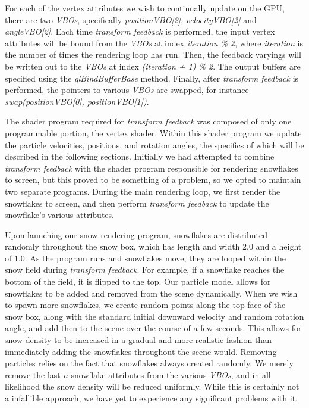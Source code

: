 \documentclass[conference]{acmsiggraph}
\begin{document}
For each of the vertex attributes we wish to continually update on the GPU, there are two \textit{VBOs}, specifically \textit{positionVBO[2]}, \textit{velocityVBO[2]} and \textit{angleVBO[2]}. Each time \textit{transform feedback} is performed, the input vertex attributes will be bound from the \textit{VBOs} at index \textit{iteration \% 2}, where \textit{iteration} is the number of times the rendering loop has run. Then, the feedback varyings will be written out to the \textit{VBOs} at index \textit{(iteration + 1) \% 2}. The output buffers are specified using the \textit{glBindBufferBase} method. Finally, after \textit{transform feedback} is performed, the pointers to various \textit{VBOs} are swapped, for instance \textit{swap(positionVBO[0], positionVBO[1])}.

The shader program required for \textit{transform feedback} was composed of only one programmable portion, the vertex shader. Within this shader program we update the particle velocities, positions, and rotation angles, the specifics of which will be described in the following sections. Initially we had attempted to combine \textit{transform feedback} with the shader program responsible for rendering snowflakes to screen, but this proved to be something of a problem, so we opted to maintain two separate programs. During the main rendering loop, we first render the snowflakes to screen, and then perform \textit{transform feedback} to update the snowflake's various attributes.

Upon launching our snow rendering program, snowflakes are distributed randomly throughout the snow box, which has length and width $2.0$ and a height of $1.0$. As the program runs and snowflakes move, they are looped within the snow field during \textit{transform feedback}. For example, if a snowflake reaches the bottom of the field, it is flipped to the top. Our particle model allows for snowflakes to be added and removed from the scene dynamically. When we wish to spawn more snowflakes, we create random points along the top face of the snow box, along with the standard initial downward velocity and random rotation angle, and add then to the scene over the course of a few seconds. This allows for snow density to be increased in a gradual and more realistic fashion than immediately adding the snowflakes throughout the scene would. Removing particles relies on the fact that snowflakes always created randomly. We merely remove the last $n$ snowflake attributes from the various \textit{VBOs}, and in all likelihood the snow density will be reduced uniformly. While this is certainly not a infallible approach, we have yet to experience any significant problems with it.
\end{document}
